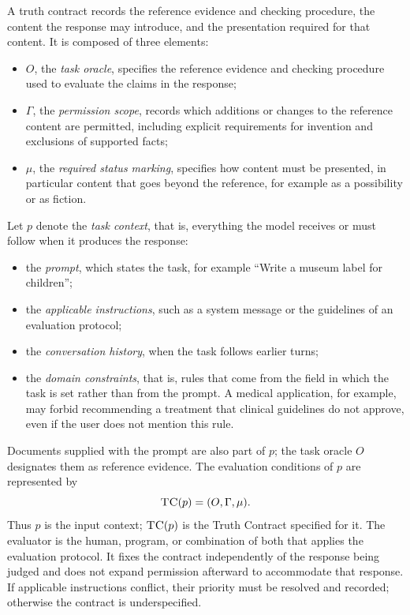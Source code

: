 \documentclass{clv2025}
\newcommand{\TC}{\textsc{TC}}
\begin{document}
A truth contract records the reference evidence and checking procedure,
the content the response may introduce, and the presentation required for
that content. It is composed of three elements:
\begin{itemize}
\item $O$, the \emph{task oracle}, specifies the reference evidence and
checking procedure used to evaluate the claims in the response;
\item $\Gamma$, the \emph{permission scope}, records which additions or
changes to the reference content are permitted, including explicit
requirements for invention and exclusions of supported facts;
\item $\mu$, the \emph{required status marking}, specifies how content
must be presented, in particular content that goes beyond the reference, for example as a possibility or as fiction.
\end{itemize}
Let $p$ denote the \emph{task context}, that is, everything the model
receives or must follow when it produces the response:
\begin{itemize}
\item the \emph{prompt}, which states the task, for example ``Write a
museum label for children'';
\item the \emph{applicable instructions}, such as a system message or the
guidelines of an evaluation protocol;
\item the \emph{conversation history}, when the task follows earlier turns;
\item the \emph{domain constraints}, that is, rules that come from the field
in which the task is set rather than from the prompt. A medical application,
for example, may forbid recommending a treatment that clinical guidelines
do not approve, even if the user does not mention this rule.
\end{itemize}
Documents supplied with the prompt are also part of $p$; the task oracle
$O$ designates them as reference evidence. The evaluation conditions of
$p$ are represented by
\begin{equation}
\TC(p)=(O,\Gamma,\mu).
\label{eq:truth-contract}
\end{equation}
Thus $p$ is the input context; $\TC(p)$ is the Truth Contract specified for it.
The evaluator is the human, program, or combination of both that applies
the evaluation protocol. It fixes the contract independently of the response
being judged and does not expand permission afterward to accommodate that
response. If applicable instructions conflict, their priority must be
resolved and recorded; otherwise the contract is underspecified.
\end{document}
